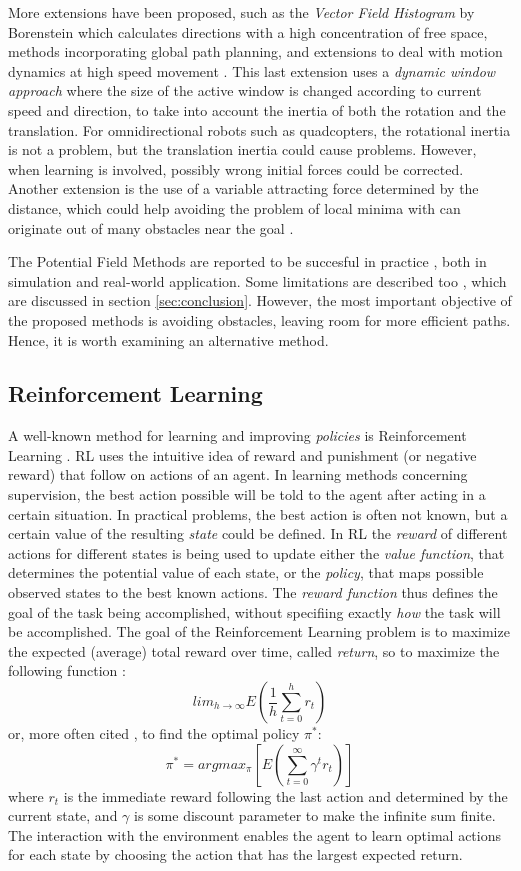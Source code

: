 \documentclass[11pt]{article}
\begin{document}
More extensions have been proposed, such as the \emph{Vector Field Histogram} by Borenstein which calculates directions with a high concentration of free space, methods incorporating global path planning, and extensions to deal with motion dynamics at high speed movement \cite{burgard97}. This last extension uses a \emph{dynamic window approach} where the size of the active window is changed according to current speed and direction, to take into account the inertia of both the rotation and the translation. For omnidirectional robots such as quadcopters, the rotational inertia is not a problem, but the translation inertia could cause problems. However, when learning is involved, possibly wrong initial forces could be corrected. Another extension is the use of a variable attracting force determined by the distance, which could help avoiding the problem of local minima with can originate out of many obstacles near the goal \cite{ge00}.

The Potential Field Methods are reported to be succesful in practice \cite{brooks86, koren91, burgard99}, both in simulation and real-world application. Some limitations are described too \cite{koren91}, which are discussed in section \ref{sec:conclusion}. However, the most important objective of the proposed methods is avoiding obstacles, leaving room for more efficient paths. Hence, it is worth examining an alternative method.


\subsection{Reinforcement Learning}
A well-known method for learning and improving \emph{policies} is Reinforcement Learning \cite[p.51-82]{sutton98}. RL uses the intuitive idea of reward and punishment (or negative reward) that follow on actions of an agent. In learning methods concerning supervision, the best action possible will be told to the agent after acting in a certain situation. In practical problems, the best action is often not known, but a certain value of the resulting \emph{state} could be defined. In RL the \emph{reward} of different actions for different states is being used to update either the \emph{value function}, that determines the potential value of each state, or the \emph{policy}, that maps possible observed states to the best known actions. The \emph{reward function} thus defines the goal of the task being accomplished, without specifiing exactly \emph{how} the task will be accomplished. The goal of the Reinforcement Learning problem is to maximize the expected (average) total reward over time, called \emph{return}, so to maximize the following function \cite{kaebling96}:
 \[ lim_{h \rightarrow \infty} E( \frac1h \sum_{t=0}^h r_t ) \]
or, more often cited \cite{li-juan08}, to find the optimal policy $\pi^*$:
 \[ \pi^* = argmax_{\pi} [ E( \sum_{t=0}^{\infty} \gamma^{t} r_t ) ] \]
where $r_t$ is the immediate reward following the last action and determined by the current state, and $\gamma$ is some discount parameter to make the infinite sum finite. The interaction with the environment enables the agent to learn optimal actions for each state by choosing the action that has the largest expected return.
\end{document}
